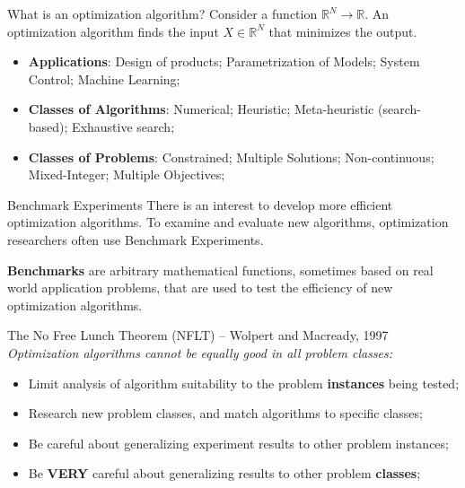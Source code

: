\documentclass[aspectratio=169]{beamer}
\begin{document}
\begin{frame}[t]{What is an optimization algorithm?}
  Consider a function $\mathbb{R}^N \to \mathbb{R}$. An optimization algorithm finds the input $X \in \mathbb{R}^N$ that minimizes the output.\medskip

  \begin{itemize}
    \item {\bf Applications}: Design of products; Parametrization of Models; System Control; Machine Learning;\medskip

    \item {\bf Classes of Algorithms}: Numerical; Heuristic; Meta-heuristic (search-based); Exhaustive search;\medskip 

    \item {\bf Classes of Problems}: Constrained; Multiple Solutions; Non-continuous; Mixed-Integer; Multiple Objectives;
  \end{itemize}
\end{frame}

\begin{frame}[t]{Benchmark Experiments}
  There is an interest to develop more efficient optimization algorithms. To examine and evaluate new algorithms, optimization researchers often use Benchmark Experiments. \bigskip 

  {\bf Benchmarks} are arbitrary mathematical functions, sometimes based on real world application problems, that are used to test the efficiency of new optimization algorithms.
  \vfill

  \begin{block}{The No Free Lunch Theorem (NFLT) -- Wolpert and Macready, 1997}
    \emph{Optimization algorithms cannot be equally good in all problem classes:}
    \begin{itemize}
      \item Limit analysis of algorithm suitability to the problem {\bf instances} being tested;
      \item Research new problem classes, and match algorithms to specific classes; 
      \item Be careful about generalizing experiment results to other problem instances;
      \item Be {\bf VERY} careful about generalizing results to other problem {\bf classes};
    \end{itemize}
  \end{block}
\end{frame}


\end{document}
